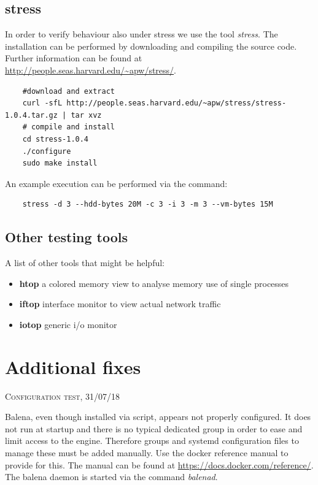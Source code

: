 \documentclass[]{scrartcl}
\begin{document}
\subsection{stress}

In order to verify behaviour also under stress we use the tool \textit{stress}. The installation can be performed by downloading and compiling the source code. Further information can be found at \url{http://people.seas.harvard.edu/~apw/stress/}.

\begin{verbatim}
	#download and extract
	curl -sfL http://people.seas.harvard.edu/~apw/stress/stress-1.0.4.tar.gz | tar xvz
	# compile and install
	cd stress-1.0.4
	./configure
	sudo make install
\end{verbatim}

An example execution can be performed via the command:

\begin{verbatim}
	stress -d 3 --hdd-bytes 20M -c 3 -i 3 -m 3 --vm-bytes 15M
\end{verbatim}

\subsection{Other testing tools}

A list of other tools that might be helpful:

\begin{itemize}
	\item \textbf{htop} a colored memory view to analyse memory use of single processes
	\item \textbf{iftop} interface monitor to view actual network traffic
	\item \textbf{iotop} generic i/o monitor
\end{itemize}

\section{Additional fixes}
{\small\textsc{Configuration test, 31/07/18} \bigskip}

Balena, even though installed via script, appears not properly configured. It does not run at startup and there is no typical dedicated group in order to ease and limit access to the engine.
Therefore groups and systemd configuration files to manage these must be added manually. Use the docker reference manual to provide for this. The manual can be found at \url{https://docs.docker.com/reference/}. The balena daemon is started via the command \textit{balenad}.
\end{document}
